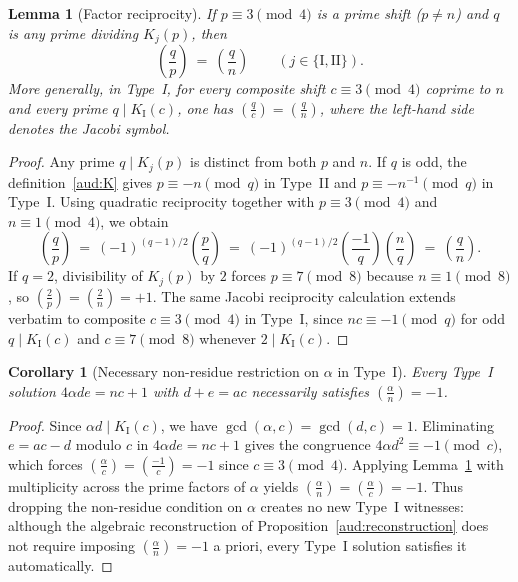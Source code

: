 \documentclass[11pt, a4paper]{article}
\theoremstyle{plain}
\newtheorem{lemma}[theorem]{Lemma}
\newtheorem{corollary}[theorem]{Corollary}
\theoremstyle{definition}
\newcommand{\leg}[2]{\left(\frac{#1}{#2}\right)}
\newcommand{\I}{\mathrm{I}}
\newcommand{\II}{\mathrm{II}}
\begin{document}
\begin{lemma}[Factor reciprocity]\label{aud:reciprocity}
If $p\equiv 3\pmod 4$ is a prime shift ($p\neq n$) and $q$ is any prime dividing $K_j(p)$, then
\begin{equation}\label{aud:reciprocityeq}
\leg{q}{p}\ =\ \leg{q}{n}\qquad(j\in\{\I,\II\}).
\end{equation}
More generally, in Type~I, for every composite shift $c\equiv 3\pmod 4$ coprime to $n$ and every prime $q\mid K_{\I}(c)$, one has $\leg{q}{c}=\leg{q}{n}$, where the left-hand side denotes the Jacobi symbol.
\end{lemma}
\begin{proof}
Any prime $q\mid K_j(p)$ is distinct from both $p$ and $n$. If $q$ is odd, the definition~\eqref{aud:K} gives $p\equiv -n\pmod q$ in Type~II and $p\equiv -n^{-1}\pmod q$ in Type~I. Using quadratic reciprocity together with $p\equiv3\pmod 4$ and $n\equiv1\pmod 4$, we obtain
\[
\leg{q}{p}\ =\ (-1)^{(q-1)/2}\leg{p}{q}\ =\ (-1)^{(q-1)/2}\leg{-1}{q}\leg{n}{q}\ =\ \leg{q}{n}.
\]
If $q=2$, divisibility of $K_j(p)$ by $2$ forces $p\equiv7\pmod 8$ because $n\equiv 1\pmod 8$, so $\leg{2}{p}=\leg{2}{n}=+1$. The same Jacobi reciprocity calculation extends verbatim to composite $c\equiv 3\pmod 4$ in Type~I, since $nc\equiv -1\pmod q$ for odd $q\mid K_{\I}(c)$ and $c\equiv7\pmod 8$ whenever $2\mid K_{\I}(c)$.
\end{proof}

\begin{corollary}[Necessary non-residue restriction on $\alpha$ in Type~I]\label{aud:alphaNR}
Every Type~I solution $4\alpha de=nc+1$ with $d+e=ac$ necessarily satisfies $\leg{\alpha}{n}=-1$.
\end{corollary}
\begin{proof}
Since $\alpha d\mid K_{\I}(c)$, we have $\gcd(\alpha,c)=\gcd(d,c)=1$. Eliminating $e=ac-d$ modulo $c$ in $4\alpha de=nc+1$ gives the congruence $4\alpha d^{2}\equiv -1\pmod c$, which forces $\leg{\alpha}{c}=\leg{-1}{c}=-1$ since $c\equiv 3\pmod 4$. Applying Lemma~\ref{aud:reciprocity} with multiplicity across the prime factors of $\alpha$ yields $\leg{\alpha}{n}=\leg{\alpha}{c}=-1$. Thus dropping the non-residue condition on $\alpha$ creates no new Type~I witnesses: although the algebraic reconstruction of Proposition~\ref{aud:reconstruction} does not require imposing $\leg{\alpha}{n}=-1$ a priori, every Type~I solution satisfies it automatically.
\end{proof}
\end{document}
